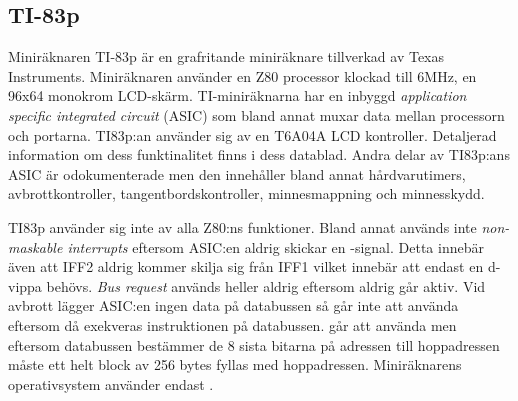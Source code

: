 \documentclass[main.tex]{subfiles}
\begin{document}
\subsection{TI-83p}
Miniräknaren TI-83p är en grafritande miniräknare tillverkad av Texas
Instruments. Miniräknaren använder en Z80 processor klockad till 6MHz, en 96x64
monokrom LCD-skärm. TI-miniräknarna har en inbyggd {\it application specific
integrated circuit} (ASIC) som bland annat muxar data mellan processorn och
portarna. TI83p:an använder sig av en T6A04A LCD kontroller. Detaljerad
information om dess funktinalitet finns i dess datablad. Andra delar av
TI83p:ans ASIC är odokumenterade men den innehåller bland annat hårdvarutimers,
avbrottkontroller, tangentbordskontroller, minnesmappning och minnesskydd.

TI83p använder sig inte av alla Z80:ns funktioner. Bland annat används inte
{\it non-maskable interrupts} eftersom ASIC:en aldrig skickar en
-signal. Detta innebär även att IFF2 aldrig kommer skilja sig från
IFF1 vilket innebär att endast en d-vippa behövs. {\it Bus request} används
heller aldrig eftersom  aldrig går aktiv. Vid avbrott lägger
ASIC:en ingen data på databussen så  går inte att använda eftersom
då exekveras instruktionen på databussen.  går att använda men
eftersom databussen bestämmer de 8 sista bitarna på adressen till hoppadressen
måste ett helt block av 256 bytes fyllas med hoppadressen. Miniräknarens
operativsystem använder endast .

\clearpage
\end{document}
